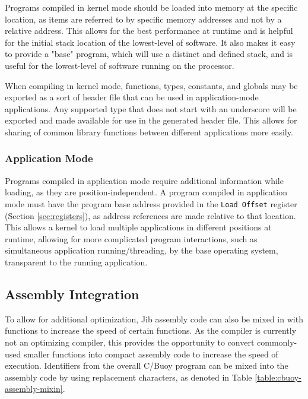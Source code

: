\documentclass{article}
\begin{document}
Programs compiled in kernel mode should be loaded into memory at the specific location, as items are referred to by specific memory addresses and not by a relative address. This allows for the best performance at runtime and is helpful for the initial stack location of the lowest-level of software. It also makes it easy to provide a "base" program, which will use a distinct and defined stack, and is useful for the lowest-level of software running on the processor.

When compiling in kernel mode, functions, types, constants, and globals may be exported as a sort of header file that can be used in application-mode applications. Any supported type that does not start with an underscore will be exported and made available for use in the generated header file. This allows for sharing of common library functions between different applications more easily.

\subsubsection{Application Mode}

Programs compiled in application mode require additional information while loading, as they are position-independent. A program compiled in application mode must have the program base address provided in the \texttt{Load Offset} register (Section \ref{sec:registers}), as address references are made relative to that location. This allows a kernel to load multiple applications in different positions at runtime, allowing for more complicated program interactions, such as simultaneous application running/threading, by the base operating system, transparent to the running application.

\subsection{Assembly Integration}

To allow for additional optimization, Jib assembly code can also be mixed in with functions to increase the speed of certain functions. As the compiler is currently not an optimizing compiler, this provides the opportunity to convert commonly-used smaller functions into compact assembly code to increase the speed of execution. Identifiers from the overall C/Buoy program can be mixed into the assembly code by using replacement characters, as denoted in Table \ref{table:cbuoy-assembly-mixin}.
\end{document}
